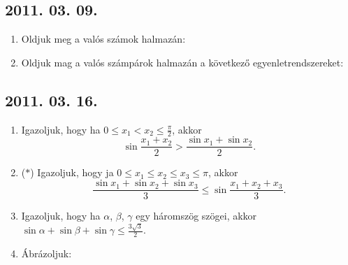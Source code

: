 \subsection*{2011. 03. 09.}
\begin{enumerate}
\item Oldjuk meg a valós számok halmazán:
\item Oldjuk mag a valós számpárok halmazán a következő egyenletrendszereket:
\end{enumerate}

\subsection*{2011. 03. 16.}
\begin{enumerate}
\item Igazoljuk, hogy ha $0\le x_1<x_2\le\frac{\pi}{2}$, akkor \[\sin\frac{x_1+x_2}{2}>\frac{\sin x_1+\sin x_2}{2}.\]
\item ($*$) Igazoljuk, hogy ja $0\le x_1\le x_2\le x_3\le \pi$, akkor \[\frac{\sin x_1+\sin x_2+\sin x_3}{3}\le\sin\frac{x_1+x_2+x_3}{3}.\]
\item Igazoljuk, hogy ha $\alpha$, $\beta$, $\gamma$ egy háromszög szögei, akkor $\sin\alpha+\sin\beta+\sin\gamma\le\frac{3\sqrt3}{2}.$
\item Ábrázoljuk:
\end{enumerate}

